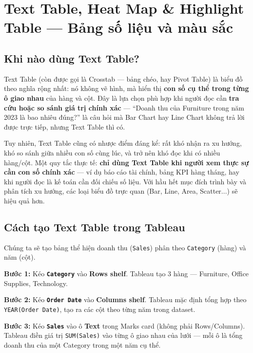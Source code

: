 \documentclass[12pt]{article}
\begin{document}
\section{Text Table, Heat Map \& Highlight Table --- Bảng số liệu và màu sắc}

\subsection{Khi nào dùng Text Table?}

\noindent Text Table (còn được gọi là Crosstab --- bảng chéo, hay Pivot Table) là biểu đồ theo nghĩa rộng nhất: nó không vẽ hình, mà hiển thị \textbf{con số cụ thể trong từng ô giao nhau} của hàng và cột. Đây là lựa chọn phù hợp khi người đọc cần \textbf{tra cứu hoặc so sánh giá trị chính xác} --- ``Doanh thu của Furniture trong năm 2023 là bao nhiêu đúng?'' là câu hỏi mà Bar Chart hay Line Chart không trả lời được trực tiếp, nhưng Text Table thì có.

\noindent Tuy nhiên, Text Table cũng có nhược điểm đáng kể: rất khó nhận ra xu hướng, khó so sánh giữa nhiều con số cùng lúc, và trở nên khó đọc khi có nhiều hàng/cột. Một quy tắc thực tế: \textbf{chỉ dùng Text Table khi người xem thực sự cần con số chính xác} --- ví dụ báo cáo tài chính, bảng KPI hàng tháng, hay khi người đọc là kế toán cần đối chiếu số liệu. Với hầu hết mục đích trình bày và phân tích xu hướng, các loại biểu đồ trực quan (Bar, Line, Area, Scatter...) sẽ hiệu quả hơn.

\subsection{Cách tạo Text Table trong Tableau}

\noindent Chúng ta sẽ tạo bảng thể hiện doanh thu (\texttt{Sales}) phân theo \texttt{Category} (hàng) và năm (cột).

\noindent \textbf{Bước 1:} Kéo \textbf{\texttt{Category}} vào \textbf{Rows shelf}. Tableau tạo 3 hàng --- Furniture, Office Supplies, Technology.

\noindent \textbf{Bước 2:} Kéo \textbf{\texttt{Order Date}} vào \textbf{Columns shelf}. Tableau mặc định tổng hợp theo \texttt{YEAR(Order Date)}, tạo ra các cột theo từng năm trong dataset.

\noindent \textbf{Bước 3:} Kéo \textbf{\texttt{Sales}} vào ô \textbf{Text} trong Marks card (không phải Rows/Columns). Tableau điền giá trị \texttt{SUM(Sales)} vào từng ô giao nhau của lưới --- mỗi ô là tổng doanh thu của một Category trong một năm cụ thể.
\end{document}
